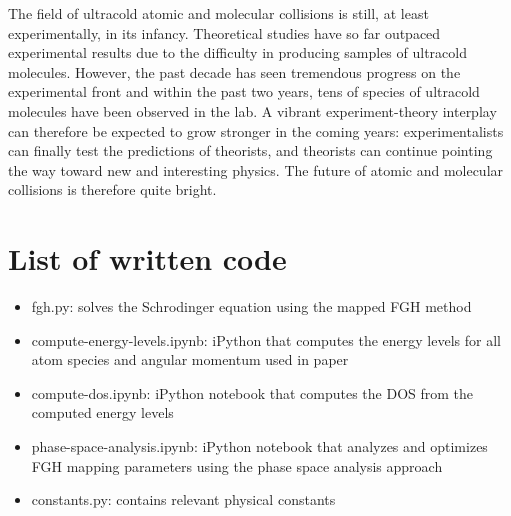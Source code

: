 \documentclass[%
 reprint,
 amsmath,amssymb,
 aps,
 nofootinbib
]{revtex4-1}
\begin{document}
The field of ultracold atomic and molecular collisions is still, at least experimentally, in its infancy. Theoretical studies have so far outpaced experimental results due to the difficulty in producing samples of ultracold molecules. However, the past decade has seen tremendous progress on the experimental front and within the past two years, tens of species of ultracold molecules have been observed in the lab. A vibrant experiment-theory interplay can therefore be expected to grow stronger in the coming years: experimentalists can finally test the predictions of theorists, and theorists can continue pointing the way toward new and interesting physics. The future of atomic and molecular collisions is therefore quite bright.



\appendix

\section{List of written code}
\begin{itemize}
\item{fgh.py: solves the Schrodinger equation using the mapped FGH method}
\item{compute-energy-levels.ipynb: iPython that computes the energy levels for all atom species and angular momentum used in paper}
\item{compute-dos.ipynb: iPython notebook that computes the DOS from the computed energy levels}
\item{phase-space-analysis.ipynb: iPython notebook that analyzes and optimizes FGH mapping parameters using the phase space analysis approach}
\item{constants.py: contains relevant physical constants}
\end{itemize}


\end{document}
